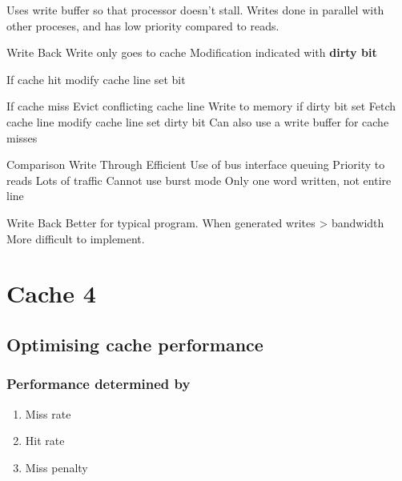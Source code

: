 \documentclass{article}
\begin{document}
			Uses write buffer so that processor doesn't stall.
			Writes done in parallel with other proceses, and has low priority compared to reads.

		Write Back
			Write only goes to cache
			Modification indicated with \textbf{dirty bit}

			If cache hit
				modify cache line
				set bit

			If cache miss
				Evict conflicting cache line
					Write to memory if dirty bit set
				Fetch cache line
				modify cache line
				set dirty bit
			Can also use a write buffer for cache misses


		Comparison
			Write Through
				Efficient Use of bus interface queuing
					Priority to reads
				Lots of traffic
					Cannot use burst mode
						Only one word written, not entire line

			Write Back
				Better for typical program. When generated writes > bandwidth
				More difficult to implement.

\section{Cache 4}
	\subsection{Optimising cache performance}
		\subsubsection{Performance determined by}
			\begin{enumerate}
				\item Miss rate
				\item Hit rate
				\item Miss penalty
			\end{enumerate}
\end{document}
